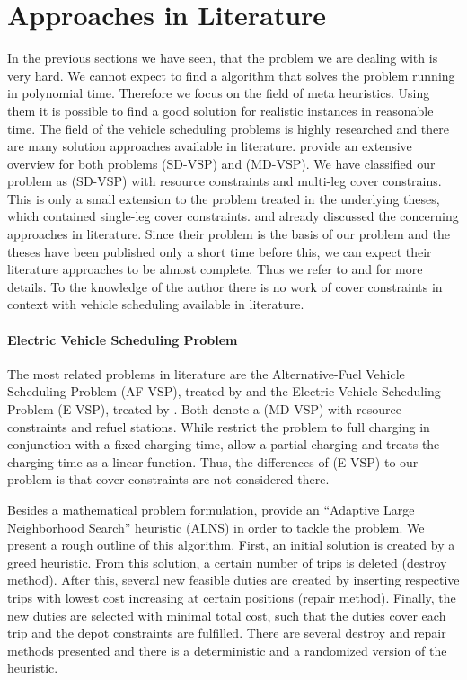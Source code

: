 
\section{Approaches in Literature}

In the previous sections we have seen, that the problem we are dealing with is very hard. We cannot expect to find a algorithm that solves the problem running in polynomial time. Therefore we focus on the field of meta heuristics. Using them it is possible to find a good solution for realistic instances in reasonable time. The field of the vehicle scheduling problems is highly researched and there are many solution approaches available in literature. \cite{Bunte_Kliewer} provide an extensive overview for both problems (SD-VSP) and (MD-VSP). We have classified our problem as (SD-VSP) with resource constraints and multi-leg cover constrains. This is only a small extension to the problem treated in the underlying theses, which contained single-leg cover constraints. \cite{Kaiser} and \cite{Knoll} already discussed the concerning approaches in literature. Since their problem is the basis of our problem and the theses have been published only a short time before this, we can expect their literature approaches to be almost complete. Thus we refer to \cite[pp. 13-15]{Kaiser} and \cite[pp. 13-15]{Knoll} for more details. To the knowledge of the author there is no work of cover constraints in context with vehicle scheduling available in literature.

\paragraph{Electric Vehicle Scheduling Problem} \parfill

The most related problems in literature are the Alternative-Fuel Vehicle Scheduling Problem (AF-VSP), treated by \cite{Adler} and the Electric Vehicle Scheduling Problem (E-VSP), treated by \cite{Wen}. Both denote a (MD-VSP) with resource constraints and refuel stations. While \cite{Adler} restrict the problem to full charging in conjunction with a fixed charging time, \cite{Wen} allow a partial charging and treats the charging time as a linear function. Thus, the differences of (E-VSP) to our problem is that cover constraints are not considered there. 

Besides a mathematical problem formulation, \cite{Wen} provide an \enquote{Adaptive Large Neighborhood Search} heuristic (ALNS) in order to tackle the problem. We present a rough outline of this algorithm. First, an initial solution is created by a greed heuristic. From this solution, a certain number of trips is deleted (destroy method). After this, several new feasible duties are created by inserting respective trips with lowest cost increasing at certain positions (repair method). Finally, the new duties are selected with minimal total cost, such that the duties cover each trip and the depot constraints are fulfilled. There are several destroy and repair methods presented and there is a deterministic and a randomized version of the heuristic.

